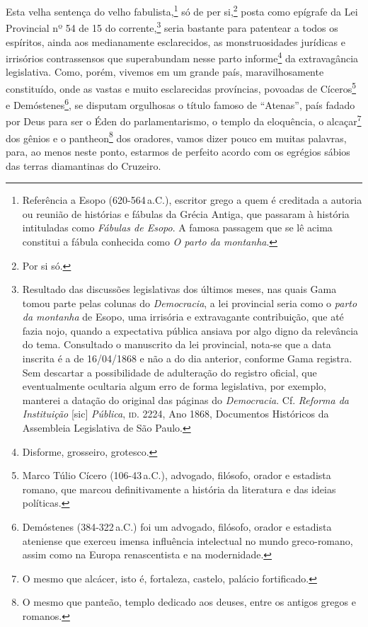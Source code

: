 Esta velha sentença do velho fabulista,\footnote{Referência a Esopo
  (620-564\,a.C.), escritor grego a quem é creditada a autoria ou reunião
  de histórias e fábulas da Grécia Antiga, que passaram à história
  intituladas como \emph{Fábulas de Esopo}. A famosa passagem que se lê
  acima constitui a fábula conhecida como \emph{O parto da montanha}.}
só de per si,\footnote{Por si só.} posta como epígrafe da Lei
Provincial nº 54 de 15 do corrente,\footnote{Resultado das discussões
  legislativas dos últimos meses, nas quais Gama tomou parte pelas
  colunas do \emph{Democracia}, a lei provincial seria como o
  \emph{parto da montanha} de Esopo, uma irrisória e extravagante
  contribuição, que até fazia nojo, quando a expectativa pública ansiava
  por algo digno da relevância do tema. Consultado o manuscrito da lei
  provincial, nota-se que a data inscrita é a de 16/04/1868 e não a do
  dia anterior, conforme Gama registra. Sem descartar a possibilidade de
  adulteração do registro oficial, que eventualmente ocultaria algum
  erro de forma legislativa, por exemplo, manterei a datação do original
  das páginas do \emph{Democracia}. Cf. \emph{Reforma da Instituição}
  {[}sic{]} \emph{Pública}, \textsc{id}. 2224, Ano 1868, Documentos Históricos da
  Assembleia Legislativa de São Paulo.} seria bastante para patentear a
todos os espíritos, ainda aos medianamente esclarecidos, as
monstruosidades jurídicas e irrisórios contrassensos que superabundam
nesse parto informe\footnote{Disforme, grosseiro, grotesco.} da
extravagância legislativa. Como, porém, vivemos em um grande país,
maravilhosamente constituído, onde as vastas e muito esclarecidas
províncias, povoadas de Cíceros\footnote{Marco Túlio Cícero (106-43\,a.C.), 
advogado, filósofo, orador e estadista romano, que
  marcou definitivamente a história da literatura e das ideias
  políticas.} e Demóstenes\footnote{Demóstenes (384-322\,a.C.) foi
  um advogado, filósofo, orador e estadista ateniense que exerceu imensa
  influência intelectual no mundo greco-romano, assim como na Europa
  renascentista e na modernidade.}, se disputam orgulhosas o título
famoso de ``Atenas'', país fadado por Deus para ser o Éden do
parlamentarismo, o templo da eloquência, o alcaçar\footnote{O mesmo
  que alcácer, isto é, fortaleza, castelo, palácio fortificado.} dos
gênios e o pantheon\footnote{O mesmo que panteão, templo dedicado aos
  deuses, entre os antigos gregos e romanos.} dos oradores, vamos dizer
pouco em muitas palavras, para, ao menos neste ponto, estarmos de
perfeito acordo com os egrégios sábios das terras diamantinas do
Cruzeiro.

